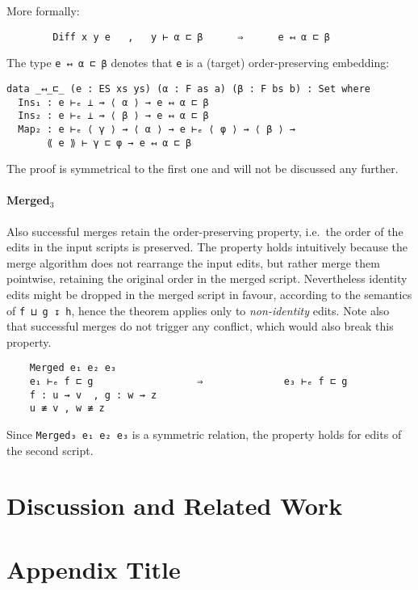 \documentclass[preprint]{sigplanconf}
\begin{document}
    More formally:
\begin{verbatim}
        Diff x y e   ,   y ⊢ α ⊏ β      ⇒      e ↤ α ⊏ β
\end{verbatim}

    The type \texttt{e ↤ α ⊏ β} denotes that \texttt{e} is a (target) 
    order-preserving embedding:

\begin{verbatim}
data _↤_⊏_ (e : ES xs ys) (α : F as a) (β : F bs b) : Set where
  Ins₁ : e ⊢ₑ ⊥ ⇝ ⟨ α ⟩ → e ↤ α ⊏ β
  Ins₂ : e ⊢ₑ ⊥ ⇝ ⟨ β ⟩ → e ↤ α ⊏ β
  Map₂ : e ⊢ₑ ⟨ γ ⟩ ⇝ ⟨ α ⟩ → e ⊢ₑ ⟨ φ ⟩ ⇝ ⟨ β ⟩ → 
       ⟪ e ⟫ ⊢ γ ⊏ φ → e ↤ α ⊏ β
\end{verbatim}

    The proof is symmetrical to the first one and will not be discussed any further.

    \paragraph{Merged$_3$}
    Also successful merges retain the order-preserving property, i.e.\
    the order of the edits in the input scripts is preserved.
    The property holds intuitively because the merge algorithm
    does not rearrange the input edits, 
    but rather merge them pointwise, retaining the original order in the merged 
    script.
    Nevertheless identity edits might be dropped in the merged script in favour,
    according to the semantics of \texttt{f ⊔ g ↧ h}, hence
    the theorem applies only to \emph{non-identity} edits.
    Note also that successful merges do not trigger any conflict, which
    would also break this property.

\begin{verbatim}
    Merged e₁ e₂ e₃
    e₁ ⊢ₑ f ⊏ g                  ⇒              e₃ ⊢ₑ f ⊏ g
    f : u ⇝ v  , g : w ⇝ z  
    u ≢ v , w ≢ z
\end{verbatim}
    Since \texttt{Merged₃ e₁ e₂ e₃} is a symmetric relation, the property holds 
    for edits of the second script. 

\section{Discussion and Related Work}

\appendix
\section{Appendix Title}
\end{document}
